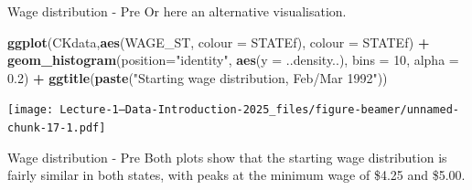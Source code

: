 \documentclass[
  ignorenonframetext,
]{beamer}
\newenvironment{Shaded}{\begin{snugshade}}{\end{snugshade}}
\newcommand{\AttributeTok}[1]{\textcolor[rgb]{0.13,0.29,0.53}{#1}}
\newcommand{\DecValTok}[1]{\textcolor[rgb]{0.00,0.00,0.81}{#1}}
\newcommand{\FloatTok}[1]{\textcolor[rgb]{0.00,0.00,0.81}{#1}}
\newcommand{\FunctionTok}[1]{\textcolor[rgb]{0.13,0.29,0.53}{\textbf{#1}}}
\newcommand{\NormalTok}[1]{#1}
\newcommand{\SpecialCharTok}[1]{\textcolor[rgb]{0.81,0.36,0.00}{\textbf{#1}}}
\newcommand{\StringTok}[1]{\textcolor[rgb]{0.31,0.60,0.02}{#1}}
\begin{document}
\begin{frame}[fragile]{Wage distribution - Pre}
\label{wage-distribution---pre-1}
Or here an alternative visualisation.

\footnotesize

\begin{Shaded}
\begin{Highlighting}[]
\FunctionTok{ggplot}\NormalTok{(CKdata,}\FunctionTok{aes}\NormalTok{(WAGE\_ST, }\AttributeTok{colour =}\NormalTok{ STATEf), }\AttributeTok{colour =}\NormalTok{ STATEf) }\SpecialCharTok{+} 
    \FunctionTok{geom\_histogram}\NormalTok{(}\AttributeTok{position=}\StringTok{"identity"}\NormalTok{, }
                   \FunctionTok{aes}\NormalTok{(}\AttributeTok{y =}\NormalTok{ ..density..),}
                   \AttributeTok{bins =} \DecValTok{10}\NormalTok{,}
                   \AttributeTok{alpha =} \FloatTok{0.2}\NormalTok{) }\SpecialCharTok{+}
    \FunctionTok{ggtitle}\NormalTok{(}\FunctionTok{paste}\NormalTok{(}\StringTok{"Starting wage distribution, Feb/Mar 1992"}\NormalTok{))}
\end{Highlighting}
\end{Shaded}

\texttt{[image: Lecture-1---Data-Introduction-2025\_files/figure-beamer/unnamed-chunk-17-1.pdf]}
\normalsize
\end{frame}

\begin{frame}{Wage distribution - Pre}
\label{wage-distribution---pre-2}
Both plots show that the starting wage distribution is fairly similar in
both states, with peaks at the minimum wage of \$4.25 and \$5.00.
\end{frame}
\end{document}
